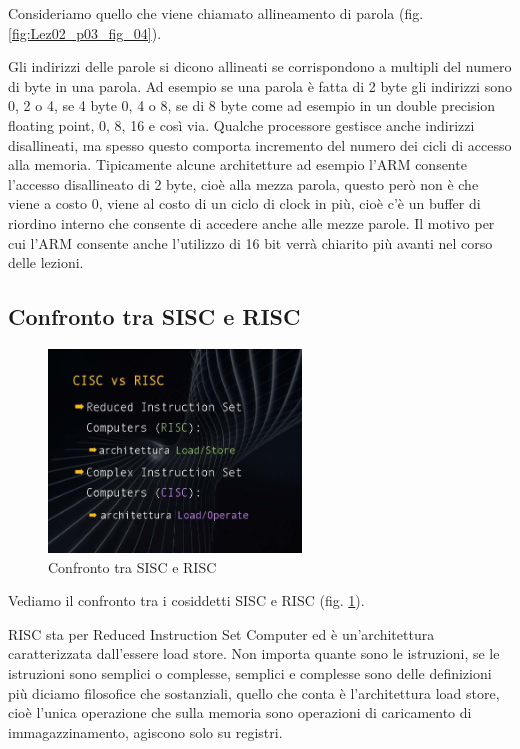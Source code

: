 Consideriamo quello che viene chiamato allineamento di parola (fig. \ref{fig:Lez02_p03_fig_04}).

Gli indirizzi delle parole si dicono allineati se corrispondono a multipli del numero di byte in una parola.
Ad esempio se una parola è fatta di 2 byte gli indirizzi sono 0, 2 o 4, se 4 byte 0, 4 o 8, se di 8 byte come ad esempio in un double precision floating point, 0, 8, 16 e così via.
Qualche processore gestisce anche indirizzi disallineati, ma spesso questo comporta incremento del numero dei cicli di accesso alla memoria.
Tipicamente alcune architetture ad esempio l'ARM consente l'accesso disallineato di 2 byte, cioè alla mezza parola, questo però non è che viene a costo 0, viene al costo di un ciclo di clock in più, cioè c'è un buffer di riordino interno che consente di accedere anche alle mezze parole.
Il motivo per cui l'ARM consente anche l'utilizzo di 16 bit verrà chiarito più avanti nel corso delle lezioni.

\subsection{Confronto tra SISC e RISC}

\FloatBarrier
\begin{figure}[H]
  \centering
  \includegraphics[width=0.6\textwidth,
                    trim=40 40 45 40, %
                    clip]{images/Lez02_p03_fig_05.png}
  \caption{Confronto tra SISC e RISC}
  \label{fig:Lez02_p03_fig_05}
\end{figure}
\FloatBarrier
\noindent
 

Vediamo il confronto tra i cosiddetti SISC e RISC (fig. \ref{fig:Lez02_p03_fig_05}).

RISC sta per Reduced Instruction Set Computer ed è un'architettura caratterizzata dall'essere load store.
Non importa quante sono le istruzioni, se le istruzioni sono semplici o complesse, semplici e complesse sono delle definizioni più diciamo filosofice che sostanziali, quello che conta è l'architettura load store, cioè l'unica operazione che sulla memoria sono operazioni di caricamento di immagazzinamento, agiscono solo su registri.

